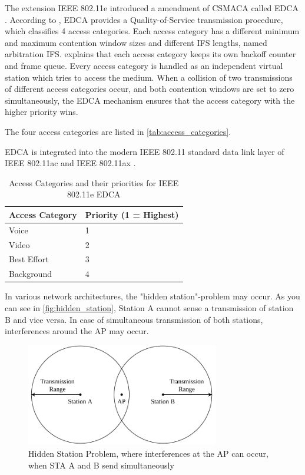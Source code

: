 The extension IEEE 802.11e introduced a amendment of \ac{CSMACA} called \ac{EDCA} \cite{sommer_vehicular_2014} \cite{wu_ieee_2006}.
According to \textcite{sommer_vehicular_2014}, \ac{EDCA} provides a Quality-of-Service transmission procedure, which classifies \num{4} access categories.
Each access category has a different minimum and maximum contention window sizes and different \ac{IFS} lengths, named
arbitration \ac{IFS}.
\textcite{wu_ieee_2006} explains that each access category keeps its own backoff counter and frame queue.
Every access category is handled as an independent virtual station which tries to access the medium.
When a collision of
two transmissions of different access categories occur, and both contention windows are set to zero simultaneously, the \ac{EDCA} mechanism ensures that the access category with the higher priority wins.

The four access categories are listed in \autoref{tab:access_categories}. 

\ac{EDCA} is integrated into the modern IEEE 802.11 standard data link layer of IEEE 802.11ac\cite{noauthor_ieee_2021-1} and IEEE 802.11ax \cite{noauthor_ieee_2021}.

\begin{table}[!ht]
   \centering
   \begin{tabular}{>{\raggedright}p{2.5cm}p{3.2cm}}
      \toprule
      Access Category & Priority (1 = Highest)\\
      \midrule
      Voice & 1 \\
      Video & 2 \\
      Best Effort & 3 \\
      Background & 4 \\
      \bottomrule
   \end{tabular}
   \caption{Access Categories and their priorities for IEEE 802.11e \ac{EDCA} \cite{wu_ieee_2006}}
   \label{tab:access_categories}
\end{table}

In various network architectures, the "hidden station"-problem may occur.
As you can see in \autoref{fig:hidden_station}, Station A cannot sense a transmission of station B and vice versa.
In case of simultaneous transmission of both stations, interferences around the \ac{AP} may occur.
\begin{figure}%
   \centering
   \includegraphics[width=0.75\textwidth]{figures/hidden_station.pdf}
   \caption{Hidden Station Problem, where interferences at the \acf{AP} can occur, when \acf{STA} A and B send simultaneously}%
   \label{fig:hidden_station}%
\end{figure}


